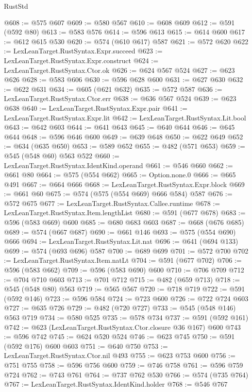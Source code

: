 \begin{lexlean}{RustStd}
\begin{coremodule}
@608 := @575 @607
@609 := @580 @567
@610 := @608 @609
@612 := @591 (@592 @80)
@613 := @583 @576
@614 := @596 @613
@615 := @614 @600
@617 := @612 @615 @530
@620 := @574 (@610 @617) @587
@621 := @572 @620
@622 := LexLeanTarget.RustSyntax.Expr.succeed
@623 := LexLeanTarget.RustSyntax.Expr.construct
@624 := LexLeanTarget.RustSyntax.Ctor.ok
@626 := @624 @567 @524
@627 := @623 @626
@628 := @583 @606
@630 := @596 @628 @600
@631 := @627 @630
@632 := @622 @631
@634 := @605 (@621 @632)
@635 := @572 @587
@636 := LexLeanTarget.RustSyntax.Ctor.err
@638 := @636 @567 @524
@639 := @623 @638
@640 := LexLeanTarget.RustSyntax.Expr.pair
@641 := LexLeanTarget.RustSyntax.Expr.lit
@642 := LexLeanTarget.RustSyntax.Lit.bool
@643 := @642 @603
@644 := @641 @643
@645 := @640 @644
@646 := @645 @644
@648 := @596 @646 @600
@649 := @639 @648
@650 := @622 @649
@652 := @634 (@635 @650)
@653 := @589 @652
@655 := @482 (@571 @653)
@659 := @545 (@548 @60) @563 @522
@660 := LexLeanTarget.RustSyntax.IdentKind.operand
@661 := @546 @660
@662 := @661 @80
@664 := @575 (@554 @662)
@665 := Option.none.{0}
@666 := @665 @491
@667 := @664 @666
@668 := LexLeanTarget.RustSyntax.Expr.block
@669 := @661 @60
@675 := @574 (@575 (@554 @669) @666 @584) @587
@676 := @572 @675
@677 := LexLeanTarget.RustSyntax.Callee.runtime
@678 := LexLeanTarget.RustSyntax.Item.lengthList
@680 := @591 (@677 @678)
@683 := @596 (@583 @669) @600
@685 := @680 @683 @603
@687 := @668 (@676 @685)
@689 := @574 (@667 @687)
@690 := @661 @146
@693 := @575 (@554 @690) @666
@694 := LexLeanTarget.RustSyntax.Lit.nat
@696 := @641 (@694 @133)
@699 := @574 (@693 @696) @587
@700 := @689 @699
@701 := @572 @700
@702 := LexLeanTarget.RustSyntax.Item.natLt
@704 := @591 (@677 @702)
@706 := @596 (@583 @662)
@709 := @596 (@583 @690) @600
@710 := @706 @709
@712 := @704 @710 @603
@713 := @701 @712
@715 := @482 (@659 @713)
@718 := @545 (@548 @80) @563
@719 := @565 @567
@720 := @718 @719
@722 := @591 (@592 @146)
@723 := @596 @584
@724 := @723 @600
@726 := @722 @724 @603
@727 := @635 @726
@729 := @482 (@720 @727)
@733 := @545 (@548 @146) @563 @719
@734 := @580 @525
@735 := @578 @734
@737 := @591 (@592 @161)
@742 := @623 (LexLeanTarget.RustSyntax.Ctor.closure @36 @167) @600
@743 := @596 @742
@745 := @624 @520 @524
@746 := @623 @745
@750 := @591 (@592 @176) @600 @603
@751 := @640 @750
@753 := LexLeanTarget.RustSyntax.Ctor.nil @493
@755 := @623 @753 @600
@756 := @751 @755
@758 := @596 @756 @600
@759 := @746 @758
@761 := @596 @759 @724
@762 := @743 @761
@764 := @737 @762 @530
@766 := @574 (@735 @764)
@767 := LexLeanTarget.RustSyntax.IdentKind.holder
@768 := @546 @767

\end{coremodule}
\end{lexlean}
